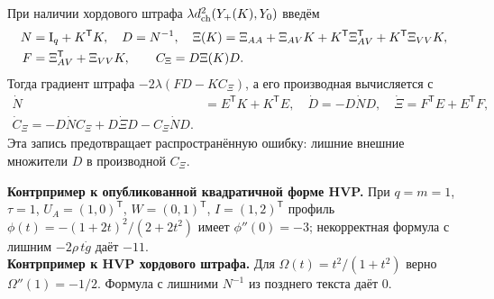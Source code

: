 \documentclass[10.5pt,a4paper]{article}
\newcommand{\I}{\mathrm{I}}
\newcommand{\T}{^{\mathsf T}}
\numberwithin{equation}{section}
\theoremstyle{plain}
\theoremstyle{definition}
\begin{document}
При наличии хордового штрафа $\lambda d_{\rm ch}^2(Y_+(K),Y_0)$ введём
\begin{align}
 N&=\I_q+K\T K,\quad D=N^{-1},\quad
 \Xi(K)=\Xi_{AA}+\Xi_{AV}K+K\T\Xi_{AV}\T+K\T\Xi_{VV}K,\notag\\
 F&=\Xi_{AV}\T+\Xi_{VV}K,\qquad C_\Xi=D\Xi(K)D.
\end{align}
Тогда градиент штрафа $-2\lambda(FD-KC_\Xi)$, а его производная вычисляется с
\begin{equation}
 \begin{split}
 \dot N&=E\T K+K\T E,\quad \dot D=-D\dot N D,\quad
 \dot\Xi=F\T E+E\T F,\\
 \boxed{\dot C_\Xi=-D\dot N C_\Xi+D\dot\Xi D-C_\Xi\dot N D.}
 \end{split}
 \label{eq:correctC}
\end{equation}
Эта запись предотвращает распространённую ошибку: лишние внешние множители $D$ в производной $C_\Xi$.

\begin{auditbox}
\textbf{Контрпример к опубликованной квадратичной форме HVP.} При $q=m=1$, $\tau=1$, $U_A=(1,0)\T$, $W=(0,1)\T$, $I=(1,2)\T$ профиль
$\phi(t)=-(1+2t)^2/(2+2t^2)$ имеет $\phi''(0)=-3$; некорректная формула с лишним $-2\rho\,t\dot g$ даёт $-11$.\\
\textbf{Контрпример к HVP хордового штрафа.} Для $\Omega(t)=t^2/(1+t^2)$ верно $\Omega''(1)=-1/2$. Формула с лишними $N^{-1}$ из позднего текста даёт $0$.
\end{auditbox}
\end{document}
